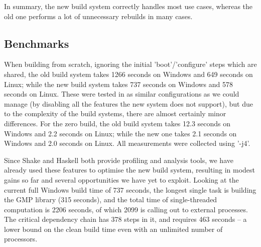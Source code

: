 %
%

In summary, the new build system correctly handles most use cases, whereas
the old one performs a lot of unnecessary rebuilds in many cases.

\subsection{Benchmarks\label{sec:benchmarks}}

When building from scratch, ignoring the initial \lst'boot'/\lst'configure'
steps which are shared, the old build system takes 1266 seconds on Windows and
649 seconds on Linux; while the new build system takes 737 seconds on Windows and
578 seconds on Linux. These were tested in as similar configurations as we could
manage (by disabling all the features the new system does not support),
but due to the complexity of the build systems, there are almost certainly
minor differences. For the zero build, the old build system takes 12.3
seconds on Windows and 2.2 seconds on Linux; while the new one takes
2.1 seconds on Windows and 2.0 seconds on Linux. All measurements were collected
using \lst'-j4'.

Since Shake and Haskell both provide profiling and analysis tools, we have
already used these features to optimise the new build system, resulting in
modest gains so far and several opportunities we have yet to exploit. Looking at
the current full Windows build time of 737 seconds, the longest single task is
building the GMP library (315 seconds), and the total time of single-threaded
computation is 2206 seconds, of which 2099 is calling out to external processes.
The critical dependency chain has 378 steps in it, and requires 463 seconds -- a
lower bound on the clean build time even with an unlimited number of processors.
